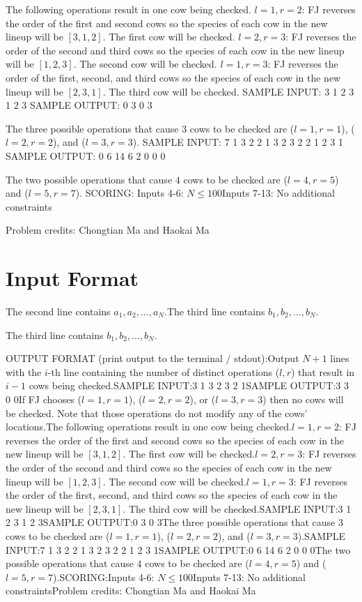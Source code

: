 \documentclass[12pt]{article}
\begin{document}
The following operations result in one cow being checked.
$l=1,r=2$: FJ reverses the order of the first and second cows so the species
of each cow in the new lineup will be $[3,1,2]$. The first cow will be checked.
$l=2,r=3$: FJ reverses the order of the second and third cows so the species
of each cow in the new lineup will be $[1,2,3]$. The second cow will be checked.
$l=1,r=3$: FJ reverses the order of the first, second, and third cows so the
species of each cow in the new lineup will be $[2,3,1]$. The third cow will be
checked. 
SAMPLE INPUT:
3
1 2 3
1 2 3
SAMPLE OUTPUT: 
0
3
0
3

The three possible operations that cause $3$ cows to be checked are ($l=1,r=1$),
($l=2,r=2$), and ($l=3,r=3$).
SAMPLE INPUT:
7
1 3 2 2 1 3 2
3 2 2 1 2 3 1
SAMPLE OUTPUT: 
0
6
14
6
2
0
0
0

The two possible operations that cause $4$ cows to be checked are ($l=4,r=5$)
and ($l=5,r=7$).
SCORING:
Inputs 4-6: $N\le 100$Inputs 7-13: No additional constraints


Problem credits: Chongtian Ma and Haokai Ma



\section*{Input Format}
The second line contains $a_1, a_2, \ldots, a_N$.The third line contains $b_1, b_2, \ldots, b_N$.

The third line contains $b_1, b_2, \ldots, b_N$.

OUTPUT FORMAT (print output to the terminal / stdout):Output $N+1$ lines with the $i$-th line containing the number of distinct
operations ($l,r$) that result in $i-1$ cows being checked.SAMPLE INPUT:3
1 3 2
3 2 1SAMPLE OUTPUT:3
3
0
0If FJ chooses ($l=1,r=1$), ($l=2,r=2$), or ($l=3,r=3$) then no cows will be
checked. Note that those operations do not modify any of the cows' locations.The following operations result in one cow being checked.$l=1,r=2$: FJ reverses the order of the first and second cows so the species
of each cow in the new lineup will be $[3,1,2]$. The first cow will be checked.$l=2,r=3$: FJ reverses the order of the second and third cows so the species
of each cow in the new lineup will be $[1,2,3]$. The second cow will be checked.$l=1,r=3$: FJ reverses the order of the first, second, and third cows so the
species of each cow in the new lineup will be $[2,3,1]$. The third cow will be
checked.SAMPLE INPUT:3
1 2 3
1 2 3SAMPLE OUTPUT:0
3
0
3The three possible operations that cause $3$ cows to be checked are ($l=1,r=1$),
($l=2,r=2$), and ($l=3,r=3$).SAMPLE INPUT:7
1 3 2 2 1 3 2
3 2 2 1 2 3 1SAMPLE OUTPUT:0
6
14
6
2
0
0
0The two possible operations that cause $4$ cows to be checked are ($l=4,r=5$)
and ($l=5,r=7$).SCORING:Inputs 4-6: $N\le 100$Inputs 7-13: No additional constraintsProblem credits: Chongtian Ma and Haokai Ma
\end{document}
